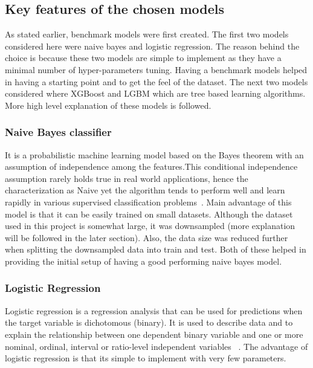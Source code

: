 \documentclass[journal,twoside,web]{ieeecolor}
\begin{document}
\subsection{Key features of the chosen models}
As stated earlier, benchmark models were first created. The first two models considered here were naive bayes and logistic regression. The reason behind the choice is because these two models are simple to implement as they have a minimal number of hyper-parameters tuning. Having a benchmark models helped in having a starting point and to get the feel of the dataset. The next two models considered where XGBoost and LGBM which are tree based learning algorithms. More high level explanation of these models is followed.  
                        
\subsubsection{Naive Bayes classifier}
It is a probabilistic machine learning model based on the Bayes theorem with an assumption of independence among the features.This  conditional independence  assumption  rarely  holds  true  in  real world  applications,  hence  the  characterization  as Naive yet the algorithm tends to perform well and learn  rapidly  in  various  supervised classification problems~\cite{dimitoglou2012comparison}. Main advantage of this model is that it can be easily trained on small datasets. Although the dataset used in this project is somewhat large, it was downsampled (more explanation will be followed in the later section). Also, the data size was reduced further when splitting the downsampled data into train and test. Both of these helped in providing the initial setup of having a good performing naive bayes model. 

                        
\subsubsection{Logistic Regression}
Logistic regression is a regression analysis that can be used for predictions when the target variable is dichotomous (binary). It is used to describe data and to explain the relationship between one dependent binary variable and one or more nominal, ordinal, interval or ratio-level independent variables ~\cite{statisticssolutions}. The advantage of logistic regression is that its simple to implement with very few parameters.
\end{document}
